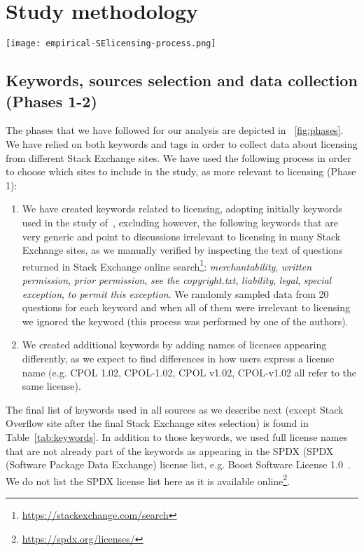 \documentclass{elsarticle}
\begin{document}
\section{Study methodology}

\begin{figure*}[!t]
\centering
\texttt{[image: empirical-SElicensing-process.png]}
\caption{Analysis phases.}
\label{fig:phases}
\end{figure*}

\subsection{Keywords, sources selection and data collection (Phases 1-2)}

The phases that we have followed for our analysis are depicted in \figurename~\ref{fig:phases}. We have relied on both keywords and tags in order to collect data about licensing from different Stack Exchange sites. We have used the following process in order to choose which sites to include in the study, as more relevant to licensing (Phase 1):
\begin{enumerate}
    \item We have created keywords related to licensing, adopting initially keywords used in the study of~\cite{vendome2017license}, excluding however, the following keywords that are very generic and point to discussions irrelevant to licensing in many Stack Exchange sites, as we manually verified by inspecting the text of questions returned in Stack Exchange online search\footnote{\url{https://stackexchange.com/search}}: \emph{merchantability}, \emph{written permission}, \emph{prior permission}, \emph{see the copyright.txt}, \emph{liability}, \emph{legal}, \emph{special exception}, \emph{to permit this exception}. We randomly sampled data from 20 questions for each keyword and when all of them were irrelevant to licensing we ignored the keyword (this process was performed by one of the authors).
    \item We created additional keywords by adding names of licenses appearing differently, as we expect to find differences in how users express a license name (e.g. CPOL 1.02, CPOL-1.02, CPOL v1.02, CPOL-v1.02 all refer to the same license). 
\end{enumerate}

The final list of keywords used in all sources as we describe next (except Stack Overflow site after the final Stack Exchange sites selection) is found in Table~\ref{tab:keywords}. In addition to those keywords, we used full license names that are not already part of the keywords as appearing in the SPDX (SPDX (Software Package Data Exchange) license list, e.g. Boost Software License 1.0~\cite{stewart2010software}. We do not list the SPDX license list here as it is available online\footnote{\url{https://spdx.org/licenses/}}.
\end{document}
